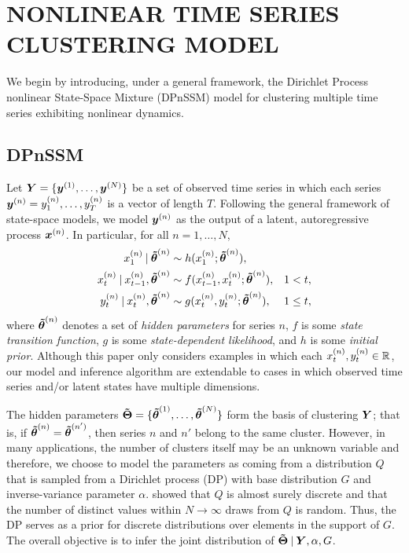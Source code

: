 \documentclass[twoside]{article}
\begin{document}
\section{NONLINEAR TIME SERIES CLUSTERING MODEL}

We begin by introducing, under a general framework, the Dirichlet Process nonlinear State-Space Mixture (DPnSSM) model for clustering multiple time series exhibiting nonlinear dynamics.

\subsection{DPnSSM} \label{sec:DPnSSM}

Let $\bd Y = \{\bidx y 1, \ldots, \bidx y N\}$ be a set of observed time series in which each series $\bidx y n = \idx[1] y n, \ldots, \idx[T] y n$ is a vector of length $T$.  Following the general framework of state-space models, we model $\bidx y n$ as the output of a latent, autoregressive process $\bidx x n$.  In particular, for all $n = 1, \ldots, N$,
\begin{align}
{\idx[1] x n} \given \idx {\bd{\tilde{\theta}}} n &\sim h(\idx[1] x n; \idx {\bd{\tilde{\theta}}} n), \\
\idx[t] x n \given \idx[t-1] x n, \idx {\bd{\tilde{\theta}}} n &\sim f(\idx[t-1] x n, \idx[t] x n; \idx {\bd{\tilde{\theta}}} n), &   1 < t,  \nonumber \\ 
\idx[t] y n \given \idx[t] x n, \idx {\bd{\tilde{\theta}}} n &\sim g(\idx[t] x n, \idx[t] y n; \idx {\bd{\tilde{\theta}}} n ),  &  1 \leq t, \nonumber
\end{align}
where $\idx {\bd{\tilde{\theta}}} n$ denotes a set of \emph{hidden parameters} for series $n$, $f$ is some \emph{state transition function}, $g$ is some \emph{state-dependent likelihood}, and {$h$ is some \emph{initial prior}}.  Although this paper only considers examples in which each $\idx[t] x n, \idx[t] y n \in \R$, our model and inference algorithm are extendable to cases in which observed time series and/or latent states have multiple dimensions. 

The hidden parameters ${\bd{\tilde{\Theta}}}  = \{\idx {\bd{\tilde{\theta}}}  1, \ldots, \idx {\bd{\tilde{\theta}}}  N\}$ form the basis of clustering $\bd Y$; that is, if $\bidx \ttheta n = \bidx \ttheta {n'}$, then series $n$ and $n'$ belong to the same cluster.  However, in many applications, the number of clusters itself may be an unknown variable and therefore, we choose to model the parameters as coming from a distribution $Q$ that is sampled from a Dirichlet process (DP) with base distribution $G$ and inverse-variance parameter $\alpha$.  \cite{ferguson1973bayesian} showed that $Q$ is almost surely discrete and that the number of distinct values within $N \to \infty$ draws from $Q$ is random.  Thus, the DP serves as a prior for discrete distributions over elements in the support of $G$.  The overall objective is to infer the joint distribution of ${\bd{\tilde{\Theta}}} \given \bd Y, \alpha, G$.
\end{document}
